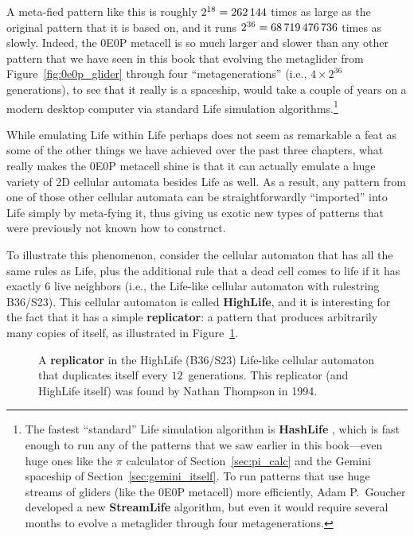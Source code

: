 A meta-fied pattern like this is roughly $2^{18} = 262{\,}144$ times as large as the original pattern that it is based on, and it runs $2^{36} = 68{\,}719{\,}476{\,}736$ times as slowly. Indeed, the 0E0P metacell is so much larger and slower than any other pattern that we have seen in this book that evolving the metaglider from Figure~\ref{fig:0e0p_glider} through four ``metagenerations'' (i.e., $4 \times 2^{36}$ generations), to see that it really is a spaceship, would take a couple of years on a modern desktop computer via standard Life simulation algorithms.\footnote{The fastest ``standard'' Life simulation algorithm is \textbf{HashLife} \cite{Gos84}, which is fast enough to run any of the patterns that we saw earlier in this book---even huge ones like the $\pi$ calculator of Section~\ref{sec:pi_calc} and the Gemini spaceship of Section~\ref{sec:gemini_itself}. To run patterns that use huge streams of gliders (like the 0E0P metacell) more efficiently, Adam P.~Goucher developed a new \textbf{StreamLife} algorithm, but even it would require several months to evolve a metaglider through four metagenerations.}

While emulating Life within Life perhaps does not seem as remarkable a feat as some of the other things we have achieved over the past three chapters, what really makes the 0E0P metacell shine is that it can actually emulate a huge variety of 2D cellular automata besides Life as well. As a result, any pattern from one of those other cellular automata can be straightforwardly ``imported'' into Life simply by meta-fying it, thus giving us exotic new types of patterns that were previously not known how to construct.

To illustrate this phenomenon, consider the cellular automaton that has all the same rules as Life, plus the additional rule that a dead cell comes to life if it has exactly $6$ live neighbors (i.e., the Life-like cellular automaton with rulestring B36/S23). This cellular automaton is called \textbf{HighLife}, and it is interesting for the fact that it has a simple \textbf{replicator}: a pattern that produces arbitrarily many copies of itself, as illustrated in Figure~\ref{fig:highlife_replicator}.

\begin{figure}[!htb]
	\centering
	\caption{A \textbf{replicator} in the HighLife (B36/S23) Life-like cellular automaton that duplicates itself every $12$~generations. This replicator (and HighLife itself) was found by Nathan Thompson in 1994.}\label{fig:highlife_replicator}
\end{figure}

